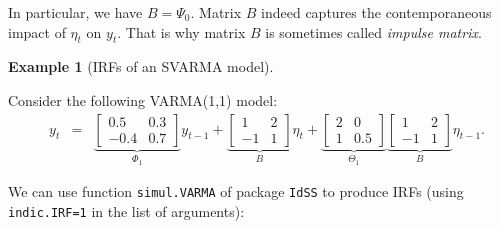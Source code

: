 \documentclass[
  12pt,
]{book}
\theoremstyle{definition}
\theoremstyle{definition}
\newtheorem{example}{Example}[chapter]
\theoremstyle{definition}
\theoremstyle{definition}
\theoremstyle{remark}
\begin{document}
In particular, we have \(B = \Psi_0\). Matrix \(B\) indeed captures the contemporaneous impact of \(\eta_t\) on \(y_t\). That is why matrix \(B\) is sometimes called \emph{impulse matrix}.

\begin{example}[IRFs of an SVARMA model]
\protect\hypertarget{exm:IRFVARMA}{}\label{exm:IRFVARMA}

Consider the following VARMA(1,1) model:
\begin{eqnarray}
\quad y_t &=&
\underbrace{\left[\begin{array}{cc}
0.5 & 0.3 \\
-0.4 & 0.7
\end{array}\right]}_{\Phi_1}
y_{t-1} +  
\underbrace{\left[\begin{array}{cc}
1 & 2 \\
-1 & 1
\end{array}\right]}_{B}\eta_t + \underbrace{\left[\begin{array}{cc}
2 & 0 \\
1 & 0.5
\end{array}\right]}_{\Theta_1} \underbrace{\left[\begin{array}{cc}
1 & 2 \\
-1 & 1
\end{array}\right]}_{B}\eta_{t-1}.\label{eq:VARMA111}
\end{eqnarray}

We can use function \texttt{simul.VARMA} of package \texttt{IdSS} to produce IRFs (using \texttt{indic.IRF=1} in the list of arguments):


\end{example}
\end{document}
